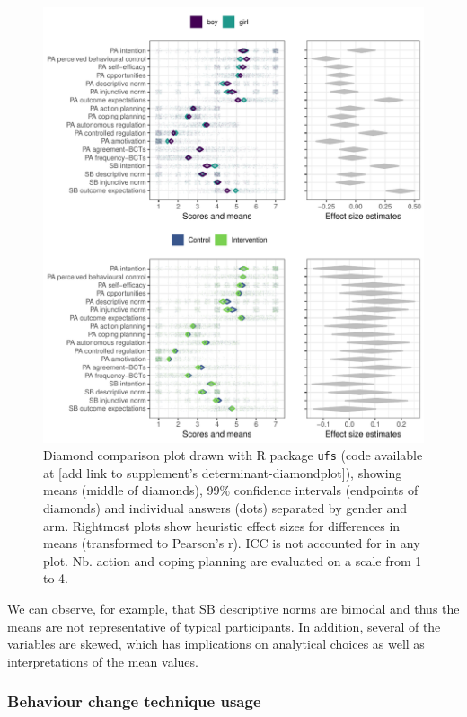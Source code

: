 \documentclass[english,man,floatsintext]{apa6}
\begin{document}
\begin{figure}
\centering
\includegraphics{_baseline-manuscript_files/figure-latex/determinant-diamondplot-manuscript-1.pdf}
\caption{\label{fig:determinant-diamondplot-manuscript}Diamond comparison plot drawn with R package \texttt{ufs} (code available at {[}add link to supplement's determinant-diamondplot{]}), showing means (middle of diamonds), 99\% confidence intervals (endpoints of diamonds) and individual answers (dots) separated by gender and arm. Rightmost plots show heuristic effect sizes for differences in means (transformed to Pearson's r). ICC is not accounted for in any plot. Nb. action and coping planning are evaluated on a scale from 1 to 4.}
\end{figure}

We can observe, for example, that SB descriptive norms are bimodal and thus the means are not representative of typical participants. In addition, several of the variables are skewed, which has implications on analytical choices as well as interpretations of the mean values.

\hypertarget{behaviour-change-technique-usage}{%
\subsubsection{Behaviour change technique usage}\label{behaviour-change-technique-usage}}
\end{document}
